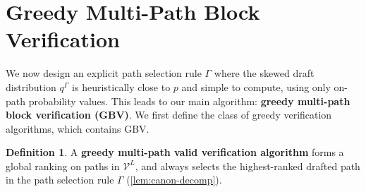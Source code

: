 \documentclass{article}
\theoremstyle{plain}
\theoremstyle{definition}
\newtheorem{definition}[theorem]{Definition}
\theoremstyle{remark}
\newcommand{\V}{\mathcal{V}}
\newcommand{\ihat}{\overline{i}}
\begin{document}
\section{Greedy Multi-Path Block Verification}
\label{sec:greedy}




We now design an explicit path selection rule $\Gamma$ where the skewed draft distribution $q^\Gamma$ is heuristically close to $p$ and simple to compute, using only on-path probability values. This leads to our main algorithm: \textbf{greedy multi-path block verification (GBV)}. We first define the class of greedy verification algorithms, which contains GBV.

\begin{definition}
    A \textbf{greedy multi-path valid verification algorithm} forms a global ranking on paths in $\V^L$, and always selects the highest-ranked drafted path in the path selection rule $\Gamma$ (\cref{lem:canon-decomp}). 
    \label{def:greedy}
\end{definition}
\end{document}
